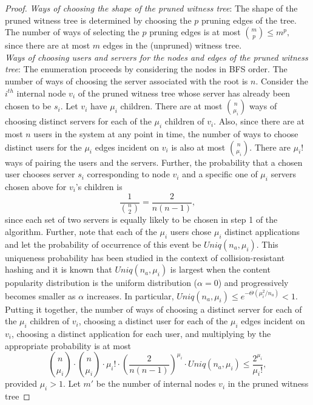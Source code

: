 \documentclass[conference]{IEEEtran}
\begin{document}
\begin{proof}
{\em Ways of choosing the shape of the pruned witness tree}:
The shape of the pruned witness tree is determined by choosing the $p$ pruning edges of the tree. The number of ways of selecting the $p$ pruning edges is at most ${m  \choose p} \leq m^{p},$ since there are at most $m$ edges in the (unpruned) witness tree. \\
{\em Ways of choosing users and
servers for the nodes and edges of the pruned witness tree}: The enumeration
proceeds by considering the nodes in BFS order.  The number of ways of
choosing the server associated with the root is $n$. Consider the $i^{th}$ internal node $v_i$ of the pruned witness tree
whose server has already been chosen to be $s_i$. Let $v_i$ have $\mu_i$
children. There are at most ${ {n} \choose {\mu_i} }$ ways of
choosing distinct servers for each of the $\mu_i$ children of
$v_i$.  Also, since there are at most $n$ users in the system
at any point in time, the number of ways to choose 
distinct users for the
$\mu_i$ edges incident on $v_i$ is also at most
${ {n} \choose {\mu_i}}$. There are ${\mu_i}!$
ways of pairing the users and the servers.
Further, the probability that a chosen user
chooses server $s_i$ corresponding to node $v_i$ and a specific one of
$\mu_i$ servers chosen above for $v_i$'s children is $$
\frac{1}{{n \choose 2}} = \frac{2}{n (n - 1)},$$ since each set of two servers is equally likely to be chosen in step 1 of the algorithm. Further, note that each of the $\mu_i$ users chose $\mu_i$ distinct applications and let the probability of occurrence of this event be $Uniq(n_a, \mu_i)$. This uniqueness probability has been studied in the context of collision-resistant hashing and it is known \cite{bellare2004hash} that
$Uniq(n_a, \mu_i)$ is largest when the content popularity distribution is the uniform distribution ($\alpha = 0$) and progressively becomes smaller as $\alpha$ increases. In particular, 
$Uniq(n_a, \mu_i) \leq e^{-\Theta(\mu^2_i/n_a)} < 1.$
Putting it together, the number of ways of choosing a distinct
server for each of the $\mu_i$ children of $v_i$, choosing a distinct
user for each of the $\mu_i$ edges incident on $v_i$, choosing a distinct application for each user, and  multiplying by the appropriate probability is at most 
\begin{equation}
\label{eq:expbd}
 {n \choose \mu_i} \cdot {n \choose \mu_i} \cdot {\mu_i}! \cdot \left (
\frac{2}{n (n - 1)}\right)^{\mu_i} \cdot Uniq(n_a, \mu_i) \leq \frac{2^{\mu_i}}{
\mu_i!}, 
\end{equation} 
provided $\mu_i > 1$.
Let $m'$ be the number of internal nodes $v_i$ in the pruned witness tree

\end{proof}
\end{document}
